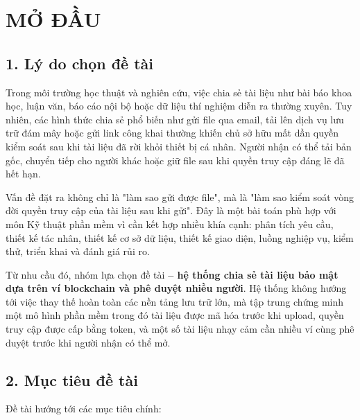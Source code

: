 \chapter*{MỞ ĐẦU}
{}

\section*{1. Lý do chọn đề tài}
{}

Trong môi trường học thuật và nghiên cứu, việc chia sẻ tài liệu như bài báo khoa học, luận văn, báo cáo nội bộ hoặc dữ liệu thí nghiệm diễn ra thường xuyên. Tuy nhiên, các hình thức chia sẻ phổ biến như gửi file qua email, tải lên dịch vụ lưu trữ đám mây hoặc gửi link công khai thường khiến chủ sở hữu mất dần quyền kiểm soát sau khi tài liệu đã rời khỏi thiết bị cá nhân. Người nhận có thể tải bản gốc, chuyển tiếp cho người khác hoặc giữ file sau khi quyền truy cập đáng lẽ đã hết hạn.

Vấn đề đặt ra không chỉ là "làm sao gửi được file", mà là "làm sao kiểm soát vòng đời quyền truy cập của tài liệu sau khi gửi". Đây là một bài toán phù hợp với môn Kỹ thuật phần mềm vì cần kết hợp nhiều khía cạnh: phân tích yêu cầu, thiết kế tác nhân, thiết kế cơ sở dữ liệu, thiết kế giao diện, luồng nghiệp vụ, kiểm thử, triển khai và đánh giá rủi ro.

Từ nhu cầu đó, nhóm lựa chọn đề tài \textbf{\projectname{} -- hệ thống chia sẻ tài liệu bảo mật dựa trên ví blockchain và phê duyệt nhiều người}. Hệ thống không hướng tới việc thay thế hoàn toàn các nền tảng lưu trữ lớn, mà tập trung chứng minh một mô hình phần mềm trong đó tài liệu được mã hóa trước khi upload, quyền truy cập được cấp bằng token, và một số tài liệu nhạy cảm cần nhiều ví cùng phê duyệt trước khi người nhận có thể mở.

\section*{2. Mục tiêu đề tài}
{}

Đề tài hướng tới các mục tiêu chính:

